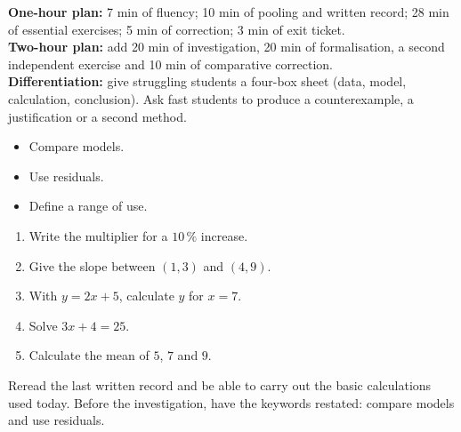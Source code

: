 \ifprof
\begin{methode}
\textbf{One-hour plan:} 7 min of fluency; 10 min of pooling and written record; 28 min of essential exercises; 5 min of correction; 3 min of exit ticket.\\
\textbf{Two-hour plan:} add 20 min of investigation, 20 min of formalisation, a second independent exercise and 10 min of comparative correction.\\
\textbf{Differentiation:} give struggling students a four-box sheet (data, model, calculation, conclusion). Ask fast students to produce a counterexample, a justification or a second method.
\end{methode}
\fi
{}
\begin{objectifs}\begin{itemize}\item Compare models.\item Use residuals.\item Define a range of use.\end{itemize}\end{objectifs}
\begin{automatismes}\begin{enumerate}\item Write the multiplier for a $10\,\%$ increase. \item Give the slope between $(1,3)$ and $(4,9)$. \item With $y=2x+5$, calculate $y$ for $x=7$. \item Solve $3x+4=25$. \item Calculate the mean of $5$, $7$ and $9$. \end{enumerate}\end{automatismes}
\begin{prerequis}Reread the last written record and be able to carry out the basic calculations used today. Before the investigation, have the keywords restated: compare models and use residuals.\end{prerequis}

